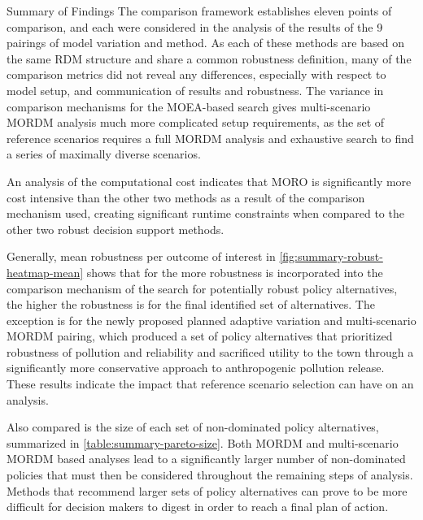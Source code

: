 \vspace{\baselineskip}
{\Large {\color{title}Summary of Findings}} 
\vspace{0.5\baselineskip} \newline
The comparison framework establishes eleven points of comparison, and each were considered in the analysis of the results of the 9 pairings of model variation and method. As each of these methods are based on the same RDM structure and share a common robustness definition, many of the comparison metrics did not reveal any differences, especially with respect to model setup, and communication of results and robustness. The variance in comparison mechanisms for the MOEA-based search gives multi-scenario MORDM analysis much more complicated setup requirements, as the set of reference scenarios requires a full MORDM analysis and exhaustive search to find a series of maximally diverse scenarios. 

An analysis of the computational cost indicates that MORO is significantly more cost intensive than the other two methods as a result of the comparison mechanism used, creating significant runtime constraints when compared to the other two robust decision support methods. 

Generally, mean robustness per outcome of interest in \cref{fig:summary-robust-heatmap-mean} shows that for the more robustness is incorporated into the comparison mechanism of the search for potentially robust policy alternatives, the higher the robustness is for the final identified set of alternatives. The exception is for the newly proposed planned adaptive variation and multi-scenario MORDM pairing, which produced a set of policy alternatives that prioritized robustness of pollution and reliability and sacrificed utility to the town through a significantly more conservative approach to anthropogenic pollution release. These results indicate the impact that reference scenario selection can have on an analysis. 

Also compared is the size of each set of non-dominated policy alternatives, summarized in \cref{table:summary-pareto-size}. Both MORDM and multi-scenario MORDM based analyses lead to a significantly larger number of non-dominated policies that must then be considered throughout the remaining steps of analysis. Methods that recommend larger sets of policy alternatives can prove to be more difficult for decision makers to digest in order to reach a final plan of action. 


